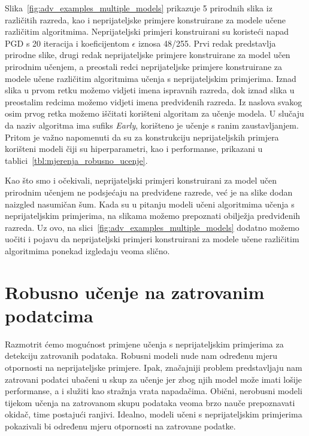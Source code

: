 \documentclass[times, utf8, zavrsni, numeric]{fer}
\begin{document}
Slika~\ref{fig:adv_examples_multiple_models} prikazuje 5 prirodnih slika iz različitih razreda, kao i neprijateljske primjere konstruirane za modele učene različitim algoritmima.
Neprijateljski primjeri konstruirani su koristeći napad PGD s 20 iteracija i koeficijentom $\epsilon$ iznosa 48/255. 
Prvi redak predstavlja prirodne slike, drugi redak neprijateljske primjere konstruirane za model učen prirodnim učenjem, a preostali redci neprijateljske primjere konstruirane za modele učene različitim algoritmima učenja s neprijateljskim primjerima.
Iznad slika u prvom retku možemo vidjeti imena ispravnih razreda, dok iznad slika u preostalim redcima možemo vidjeti imena predviđenih razreda.
Iz naslova svakog osim prvog retka možemo iščitati korišteni algoritam za učenje modela. U slučaju da naziv algoritma ima sufiks \textit{Early}, korišteno je učenje s ranim zaustavljanjem.
Pritom je važno napomenuti da su za konstrukciju neprijateljskih primjera korišteni modeli čiji su hiperparametri, kao i performanse, prikazani u tablici~\ref{tbl:mjerenja_robusno_ucenje}.

Kao što smo i očekivali, neprijateljski primjeri konstruirani za model učen prirodnim učenjem ne podsjećaju na predviđene razrede, već je na slike dodan naizgled nasumičan šum.
Kada su u pitanju modeli učeni algoritmima učenja s neprijateljskim primjerima, na slikama možemo prepoznati obilježja predviđenih razreda.
Uz ovo, na slici~\ref{fig:adv_examples_multiple_models} dodatno možemo uočiti i pojavu da neprijateljski primjeri konstruirani za modele učene različitim algoritmima ponekad izgledaju veoma slično.

\pagebreak

\section{Robusno učenje na zatrovanim podatcima}

Razmotrit ćemo mogućnost primjene učenja s neprijateljskim primjerima za detekciju zatrovanih podataka.
Robusni modeli nude nam određenu mjeru otpornosti na neprijateljske primjere. 
Ipak, značajniji problem predstavljaju nam zatrovani podatci ubačeni u skup za učenje jer zbog njih model može imati lošije performanse, a i služiti kao stražnja vrata napadačima.
Obični, nerobusni modeli tijekom učenja na zatrovanom skupu podataka veoma brzo nauče prepoznavati okidač, time postajući ranjivi.
Idealno, modeli učeni s neprijateljskim primjerima pokazivali bi određenu mjeru otpornosti na zatrovane podatke.
\end{document}
